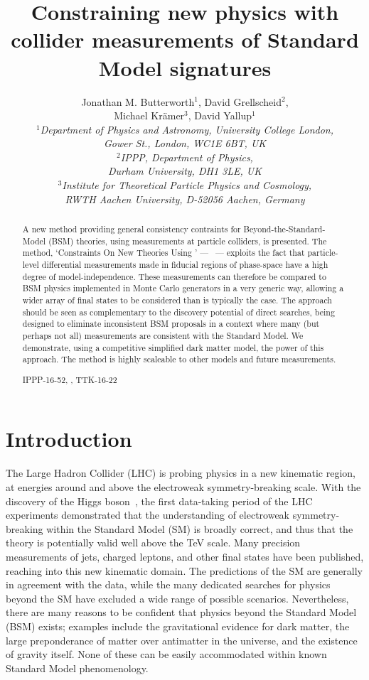 \documentclass[floatfix]{article}
\title{Constraining new physics with collider measurements of Standard Model signatures}
\author{Jonathan M. Butterworth$^1$, David Grellscheid$^2$,\\[1mm] Michael Kr\"amer$^3$, David Yallup$^1$\\[2.5mm]
\it $^1$Department of Physics and Astronomy, University College London,\\ \it Gower St., London, WC1E 6BT, UK\\[1mm]
\it $^2$IPPP, Department of Physics,\\\it Durham University, DH1 3LE, UK\\[1mm] \it $^3$Institute for Theoretical Particle Physics and Cosmology, \\ \it RWTH Aachen University, D-52056 Aachen, Germany}
\begin{document}
\maketitle 

\begin{abstract}
A new method providing general consistency contraints for Beyond-the-Standard-Model (BSM) theories, using 
measurements at particle colliders, is presented. The method, `Constraints On New Theories Using \rivet' --- \Contur \ --- exploits  
the fact that particle-level differential measurements made in fiducial regions of phase-space have a high degree of
model-independence. These measurements can therefore be compared to BSM physics implemented in Monte Carlo generators in a very
generic way, allowing a wider array of final states to be considered than is typically the case. The \Contur approach should be seen
as complementary to the discovery potential of direct searches, being designed to eliminate inconsistent 
BSM proposals in a context where many (but perhaps not all) measurements are consistent with the Standard Model.
We demonstrate, using a competitive simplified dark matter model, the power of this approach. 
The \Contur method is highly scaleable to other models and future measurements.
%
\begin{flushright}IPPP-16-52, , TTK-16-22\end{flushright}
\end{abstract}


\section{Introduction}
\label{sec:intro}
The Large Hadron Collider (LHC) is probing physics in a new kinematic region, at energies around and above the 
electroweak symmetry-breaking scale. With the discovery of the Higgs boson~\cite{Aad:2012tfa,Chatrchyan:2012ufa}, 
the first data-taking period of the LHC experiments demonstrated that the understanding of electroweak symmetry-breaking within
the Standard Model (SM) is broadly correct, and thus that the theory is potentially valid well above the
TeV scale. Many precision measurements of jets, charged leptons, and other final states 
have been published, reaching into this new kinematic domain. The predictions of the SM are 
generally in agreement with the data, while the many dedicated searches for physics beyond the SM
have excluded a wide range of possible scenarios. 
Nevertheless, there are many reasons to be confident that
physics beyond the Standard Model (BSM) exists; examples include the gravitational evidence for dark matter, the large 
preponderance of matter over antimatter in the universe, and the existence of gravity itself. None of 
these can be easily accommodated within known Standard Model phenomenology. 
\end{document}
